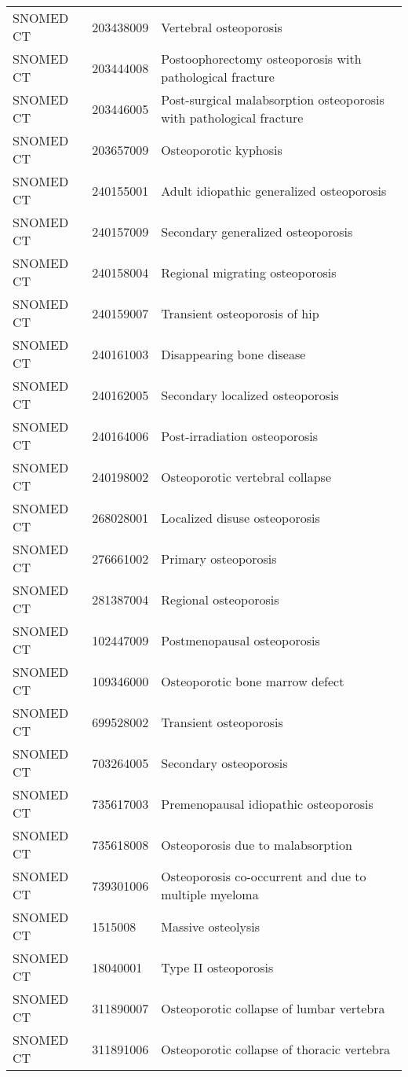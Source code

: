 \begin{longtable}{p{}p{}p{}}
  SNOMED CT & 203438009 & Vertebral osteoporosis \\ 
  SNOMED CT & 203444008 & Postoophorectomy osteoporosis with pathological fracture \\ 
  SNOMED CT & 203446005 & Post-surgical malabsorption osteoporosis with pathological fracture \\ 
  SNOMED CT & 203657009 & Osteoporotic kyphosis \\ 
  SNOMED CT & 240155001 & Adult idiopathic generalized osteoporosis \\ 
  SNOMED CT & 240157009 & Secondary generalized osteoporosis \\ 
  SNOMED CT & 240158004 & Regional migrating osteoporosis \\ 
  SNOMED CT & 240159007 & Transient osteoporosis of hip \\ 
  SNOMED CT & 240161003 & Disappearing bone disease \\ 
  SNOMED CT & 240162005 & Secondary localized osteoporosis \\ 
  SNOMED CT & 240164006 & Post-irradiation osteoporosis \\ 
  SNOMED CT & 240198002 & Osteoporotic vertebral collapse \\ 
  SNOMED CT & 268028001 & Localized disuse osteoporosis \\ 
  SNOMED CT & 276661002 & Primary osteoporosis \\ 
  SNOMED CT & 281387004 & Regional osteoporosis \\ 
  SNOMED CT & 102447009 & Postmenopausal osteoporosis \\ 
  SNOMED CT & 109346000 & Osteoporotic bone marrow defect \\ 
  SNOMED CT & 699528002 & Transient osteoporosis \\ 
  SNOMED CT & 703264005 & Secondary osteoporosis \\ 
  SNOMED CT & 735617003 & Premenopausal idiopathic osteoporosis \\ 
  SNOMED CT & 735618008 & Osteoporosis due to malabsorption \\ 
  SNOMED CT & 739301006 & Osteoporosis co-occurrent and due to multiple myeloma \\ 
  SNOMED CT & 1515008 & Massive osteolysis \\ 
  SNOMED CT & 18040001 & Type II osteoporosis \\ 
  SNOMED CT & 311890007 & Osteoporotic collapse of lumbar vertebra \\ 
  SNOMED CT & 311891006 & Osteoporotic collapse of thoracic vertebra \\ 

\end{longtable}
